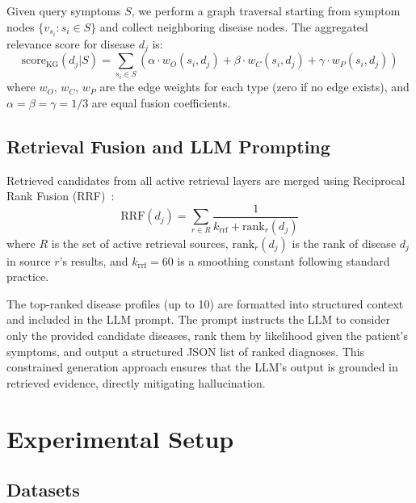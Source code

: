 \documentclass[review]{elsarticle}
\begin{document}
Given query symptoms $S$, we perform a graph traversal starting from symptom nodes $\{v_{s_i} : s_i \in S\}$ and collect neighboring disease nodes. The aggregated relevance score for disease $d_j$ is:
\begin{equation}
    \text{score}_{\text{KG}}(d_j | S) = \sum_{s_i \in S} \left(\alpha \cdot w_O(s_i, d_j) + \beta \cdot w_C(s_i, d_j) + \gamma \cdot w_P(s_i, d_j)\right)
\label{eq:kg_score}
\end{equation}
where $w_O$, $w_C$, $w_P$ are the edge weights for each type (zero if no edge exists), and $\alpha = \beta = \gamma = 1/3$ are equal fusion coefficients.

\subsection{Retrieval Fusion and LLM Prompting}
\label{sec:fusion}

Retrieved candidates from all active retrieval layers are merged using Reciprocal Rank Fusion (RRF)~\cite{cormack2009reciprocal}:
\begin{equation}
    \text{RRF}(d_j) = \sum_{r \in R} \frac{1}{k_{\text{rrf}} + \text{rank}_r(d_j)}
\end{equation}
where $R$ is the set of active retrieval sources, $\text{rank}_r(d_j)$ is the rank of disease $d_j$ in source $r$'s results, and $k_{\text{rrf}} = 60$ is a smoothing constant following standard practice.

The top-ranked disease profiles (up to 10) are formatted into structured context and included in the LLM prompt. The prompt instructs the LLM to consider only the provided candidate diseases, rank them by likelihood given the patient's symptoms, and output a structured JSON list of ranked diagnoses. This constrained generation approach ensures that the LLM's output is grounded in retrieved evidence, directly mitigating hallucination.

\section{Experimental Setup}
\label{sec:experiments}

\subsection{Datasets}
\end{document}
